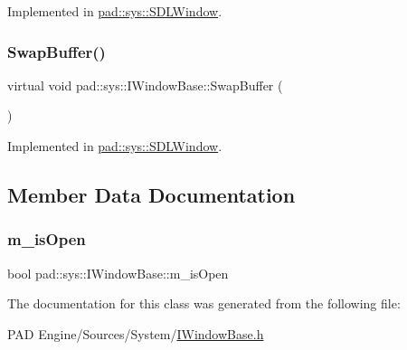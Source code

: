Implemented in \mbox{\hyperlink{classpad_1_1sys_1_1_s_d_l_window_aba5a51090a6865da6d47826af28413ef}{pad\+::sys\+::\+S\+D\+L\+Window}}.

\mbox{\label{classpad_1_1sys_1_1_i_window_base_ac6fe9dea946b20c52ad8d9372e57e6c1}} 
\subsubsection{\texorpdfstring{Swap\+Buffer()}{SwapBuffer()}}
{\footnotesize\ttfamily virtual void pad\+::sys\+::\+I\+Window\+Base\+::\+Swap\+Buffer (\begin{DoxyParamCaption}{ }\end{DoxyParamCaption})\hspace{0.3cm}{\ttfamily [pure virtual]}}



Implemented in \mbox{\hyperlink{classpad_1_1sys_1_1_s_d_l_window_a991b47b499f3073e4d1962c2512e2ae8}{pad\+::sys\+::\+S\+D\+L\+Window}}.



\subsection{Member Data Documentation}
\mbox{\label{classpad_1_1sys_1_1_i_window_base_a4ca3e1915cb3c100497ace0d7d04fa23}} 
\subsubsection{\texorpdfstring{m\+\_\+is\+Open}{m\_isOpen}}
{\footnotesize\ttfamily bool pad\+::sys\+::\+I\+Window\+Base\+::m\+\_\+is\+Open\hspace{0.3cm}{\ttfamily [protected]}}



The documentation for this class was generated from the following file\+:\begin{DoxyCompactItemize}
\item 
P\+A\+D Engine/\+Sources/\+System/\mbox{\hyperlink{_i_window_base_8h}{I\+Window\+Base.\+h}}\end{DoxyCompactItemize}
